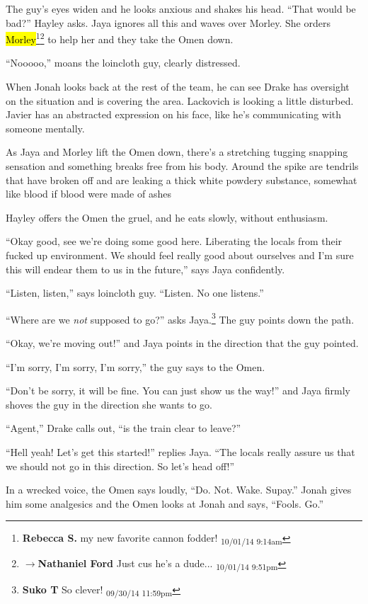 The guy's eyes widen and he looks anxious and shakes his head.  ``That would be bad?'' Hayley asks.  Jaya ignores all this and waves over Morley.  She orders \hl{Morley}\footnote{\textbf{Rebecca S. }my new favorite cannon fodder! \textsubscript{10/01/14 9:14am}}\footnote{$\rightarrow$\textbf{Nathaniel Ford }Just cus he's a dude... \textsubscript{10/01/14 9:51pm}} to help her and they take the Omen down.

``Nooooo,'' moans the loincloth guy, clearly distressed.

When Jonah looks back at the rest of the team, he can see Drake has oversight on the situation and is covering the area.  Lackovich is looking a little disturbed.  Javier has an abstracted expression on his face, like he's communicating with someone mentally.

As Jaya and Morley lift the Omen down, there's a stretching tugging snapping sensation and something breaks free from his body.  Around the spike are tendrils that have broken off and are leaking a thick white powdery substance, somewhat like blood if blood were made of ashes

Hayley offers the Omen the gruel, and he eats slowly, without enthusiasm.

``Okay good, see we're doing some good here.  Liberating the locals from their fucked up environment.  We should feel really good about ourselves and I'm sure this will endear them to us in the future,'' says Jaya confidently.

``Listen, listen,'' says loincloth guy. ``Listen. No one listens.''

``Where are we \textit{not} supposed to go?'' asks Jaya.\footnote{\textbf{Suko T }So clever! \textsubscript{09/30/14 11:59pm}}  The guy points down the path.

``Okay, we're moving out!'' and Jaya points in the direction that the guy pointed.

``I'm sorry, I'm sorry, I'm sorry,'' the guy says to the Omen.

``Don't be sorry, it will be fine.  You can just show us the way!'' and Jaya firmly shoves the guy in the direction she wants to go.

``Agent,'' Drake calls out, ``is the train clear to leave?''

``Hell yeah!  Let's get this started!'' replies Jaya.  ``The locals really assure us that we should not go in this direction.  So let's head off!''

In a wrecked voice, the Omen says loudly, ``Do.  Not.  Wake.  Supay.''  Jonah gives him some analgesics and the Omen looks at Jonah and says, ``Fools.  Go.''



